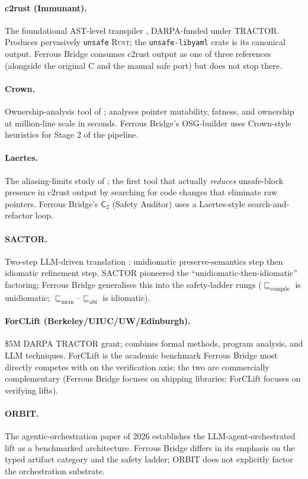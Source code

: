 \documentclass[12pt]{article}
\theoremstyle{definition}
\theoremstyle{remark}
\newcommand{\rust}{\textnormal{\textsc{Rust}}}
\newcommand{\unsafelibyaml}{\texttt{unsafe-libyaml}}
\newcommand{\Agent}[1]{\ensuremath{\mathsf{#1}}}
\newcommand{\Compile}{\ensuremath{\sqsubseteq_{\!\mathrm{compile}}}}
\newcommand{\Memory}{\ensuremath{\sqsubseteq_{\!\mathrm{mem}}}}
\newcommand{\ABI}{\ensuremath{\sqsubseteq_{\!\mathrm{abi}}}}
\begin{document}
\paragraph{c2rust (Immunant).} The foundational AST-level transpiler
\cite{c2rust2025}, DARPA-funded under TRACTOR. Produces pervasively
\texttt{unsafe} \rust{}; the \unsafelibyaml{} crate is its canonical
output. Ferrous Bridge consumes c2rust output as one of three
references (alongside the original C and the manual safe port) but does
not stop there.

\paragraph{Crown.} Ownership-analysis tool of \cite{crown2023};
analyses pointer mutability, fatness, and ownership at million-line
scale in seconds. Ferrous Bridge's OSG-builder uses Crown-style
heuristics for Stage 2 of the pipeline.

\paragraph{Laertes.} The aliasing-limits study of \cite{laertes2023};
the first tool that actually \emph{reduces} unsafe-block presence in
c2rust output by searching for code changes that eliminate raw
pointers. Ferrous Bridge's $\Agent{C}_2$ (Safety Auditor) uses a
Laertes-style search-and-refactor loop.

\paragraph{SACTOR.} Two-step LLM-driven translation
\cite{sactor2025}: unidiomatic preserve-semantics step then idiomatic
refinement step. SACTOR pioneered the
``unidiomatic-then-idiomatic'' factoring; Ferrous Bridge generalises
this into the safety-ladder rungs (\(\Compile\) is unidiomatic;
$\Memory$--$\ABI$ is idiomatic).

\paragraph{ForCLift (Berkeley/UIUC/UW/Edinburgh).} \$5M DARPA TRACTOR
grant; combines formal methods, program analysis, and LLM techniques.
ForCLift is the academic benchmark Ferrous Bridge most directly
competes with on the verification axis; the two are commercially
complementary (Ferrous Bridge focuses on shipping libraries; ForCLift
focuses on verifying lifts).

\paragraph{ORBIT.} The agentic-orchestration paper of 2026
\cite{orbit2026} establishes the LLM-agent-orchestrated lift as a
benchmarked architecture. Ferrous Bridge differs in its emphasis on
the typed artifact category and the safety ladder; ORBIT does not
explicitly factor the orchestration substrate.
\end{document}
